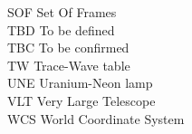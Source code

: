 \begin{tabbing}
SOF       \> Set Of Frames \\
TBD       \> To be defined \\
TBC       \> To be confirmed \\
TW       \> Trace-Wave table \\
UNE        \> Uranium-Neon lamp \\
VLT       \> Very Large Telescope \\
WCS       \> World Coordinate System \\
\end{tabbing}
